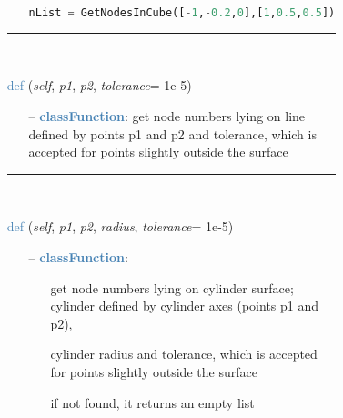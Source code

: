 \begin{itemize}[leftmargin=1.4cm]
\begin{itemize}[leftmargin=1.4cm]
\begin{itemize}[leftmargin=0.5cm]
\begin{itemize}[leftmargin=1.4cm]
\begin{itemize}[leftmargin=1.4cm]
\begin{itemize}[leftmargin=0.5cm]
\begin{itemize}[leftmargin=0.7cm]
\begin{lstlisting}[language=Python, xleftmargin=36pt]
nList = GetNodesInCube([-1,-0.2,0],[1,0.5,0.5])\end{lstlisting}\vspace{-24pt}\bi\item[]\vspace{-24pt}\vspace{12pt}\end{itemize}
%
\noindent\rule{8cm}{0.75pt}\vspace{1pt} \\ 
\begin{flushleft}
\noindent \textcolor{steelblue}{def {\bf {}}}\label{sec:FEM:FEMinterface:GetNodesOnLine}
({\it self}, {\it p1}, {\it p2}, {\it tolerance}= 1e-5)
\end{flushleft}
\setlength{\itemindent}{0.7cm}
\begin{itemize}[leftmargin=0.7cm]
  \item[--]  \textcolor{steelblue}{\bf classFunction}: get node numbers lying on line defined by points p1 and p2 and tolerance, which is accepted for points slightly outside the surface\vspace{12pt}\end{itemize}
%
\noindent\rule{8cm}{0.75pt}\vspace{1pt} \\ 
\begin{flushleft}
\noindent \textcolor{steelblue}{def {\bf {}}}\label{sec:FEM:FEMinterface:GetNodesOnCylinder}
({\it self}, {\it p1}, {\it p2}, {\it radius}, {\it tolerance}= 1e-5)
\end{flushleft}
\setlength{\itemindent}{0.7cm}
\begin{itemize}[leftmargin=0.7cm]
  \item[--]  \textcolor{steelblue}{\bf classFunction}: \vspace{-6pt}
  \begin{itemize}[leftmargin=1.2cm]
\setlength{\itemindent}{-0.7cm}
    \item[] get node numbers lying on cylinder surface; cylinder defined by cylinder axes (points p1 and p2),
    \item[]   cylinder radius and tolerance, which is accepted for points slightly outside the surface
    \item[]   if not found, it returns an empty list
  \end{itemize}

\end{itemize}
\end{itemize}
\end{itemize}
\end{itemize}
\end{itemize}
\end{itemize}
\end{itemize}
